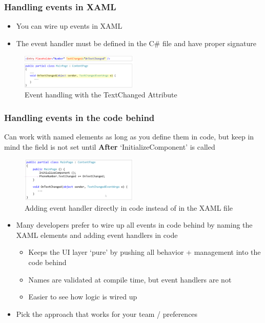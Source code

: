 \documentclass{article}
\newcommand{\bold}[1]{\textbf{#1}}
\begin{document}
\subsubsection{Handling events in XAML}

\begin{itemize}
    \item You can wire up events in XAML
    \item The event handler must be defined in the C\# file and have proper signature
\end{itemize}

\begin{figure}[H]
    \centering
    \includegraphics[width=0.5\textwidth]{xaml08.png}
    \caption{Event handling with the TextChanged Attribute}
\end{figure}

\subsubsection{Handling events in the code behind}

Can work with named elements as long as you define them in code, but keep in mind the field is not set until \bold{After} `InitializeComponent' is called

\begin{figure}[H]
    \centering
    \includegraphics[width=0.5\textwidth]{xaml09.png}
    \caption{Adding event handler directly in code instead of in the XAML file}
\end{figure}

\begin{itemize}
    \item Many developers prefer to wire up all events in code behind by naming the XAML elements and adding event handlers in code
    \begin{itemize}
        \item Keeps the UI layer `pure' by pushing all behavior + management into the code behind
        \item Names are validated at compile time, but event handlers are not
        \item Easier to see how logic is wired up
    \end{itemize}
    \item Pick the approach that works for your team / preferences
\end{itemize}
\end{document}
